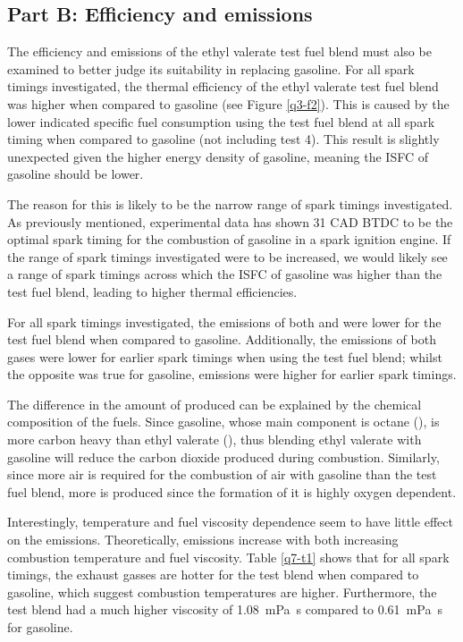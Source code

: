 \documentclass[11pt]{article}
\begin{document}
\subsection*{Part B: Efficiency and emissions}
The efficiency and emissions of the ethyl valerate test fuel blend must also be examined to better judge its suitability in replacing gasoline. For all spark timings investigated, the thermal efficiency of the ethyl valerate test fuel blend was higher when compared to gasoline (see Figure \ref{q3-f2}). This is caused by the lower indicated specific fuel consumption using the test fuel blend at all spark timing when compared to gasoline (not including test 4). This result is slightly unexpected given the higher energy density of gasoline, meaning the ISFC of gasoline should be lower.

The reason for this is likely to be the narrow range of spark timings investigated. As previously mentioned, experimental data has shown 31 CAD BTDC to be the optimal spark timing for the combustion of gasoline in a spark ignition engine. If the range of spark timings investigated were to be increased, we would likely see a range of spark timings across which the ISFC of gasoline was higher than the test fuel blend, leading to higher thermal efficiencies. 

For all spark timings investigated, the emissions of both  and  were lower for the test fuel blend when compared to gasoline. Additionally, the emissions of both gases were lower for earlier spark timings when using the test fuel blend; whilst the opposite was true for gasoline, emissions were higher for earlier spark timings.

The difference in the amount of  produced can be explained by the chemical composition of the fuels. Since gasoline, whose main component is octane (), is more carbon heavy than ethyl valerate (), thus blending ethyl valerate with gasoline will reduce the carbon dioxide produced during combustion. Similarly, since more air is required for the combustion of air with gasoline than the test fuel blend, more  is produced since the formation of it is highly oxygen dependent. 

Interestingly, temperature and fuel viscosity dependence seem to have little effect on the  emissions. Theoretically,  emissions increase with both increasing combustion temperature and fuel viscosity. Table \ref{q7-t1} shows that for all spark timings, the exhaust gasses are hotter for the test blend when compared to gasoline, which suggest combustion temperatures are higher. Furthermore, the test blend had a much higher viscosity of \SI{1.08}{\milli\pascal\second} compared to \SI{0.61}{\milli\pascal\second} for gasoline.
\end{document}
